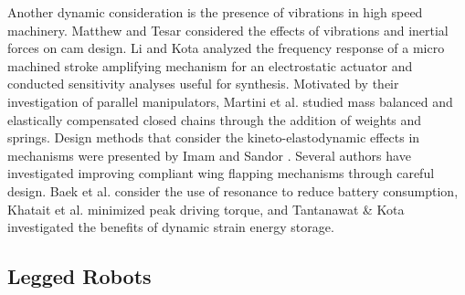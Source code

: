 \documentclass[journal]{IEEEtran}
\begin{document}
Another dynamic consideration is the presence of vibrations in high speed machinery.  
Matthew and Tesar \cite{matthewCamSystemDesign1976} considered the effects of vibrations and inertial forces on cam design.
Li and Kota \cite{liDynamicAnalysisCompliant2002} analyzed the frequency response of a micro machined stroke amplifying mechanism for an electrostatic actuator and conducted sensitivity analyses useful for synthesis.
Motivated by their investigation of parallel manipulators, Martini et al. \cite{martiniElastodynamicBehaviorBalanced2014} studied mass balanced and elastically compensated closed chains through the addition of weights and springs.
Design methods that consider the kineto-elastodynamic effects in mechanisms were presented by Imam and Sandor \cite{imamHighSpeedMechanismDesign1975}.
Several authors have investigated improving compliant wing flapping mechanisms through careful design.
Baek et al. \cite{baekEfficientResonantDrive2009} consider the use of resonance to reduce battery consumption, Khatait et al. \cite{khataitCompliantDesignFlapping2006} minimized peak driving torque, and Tantanawat \& Kota \cite{tantanawatDesignCompliantMechanisms2007} investigated the benefits of dynamic strain energy storage.


%
%
%
%
%


\subsection{Legged Robots}
\label{sec:leg_rob}
\end{document}
